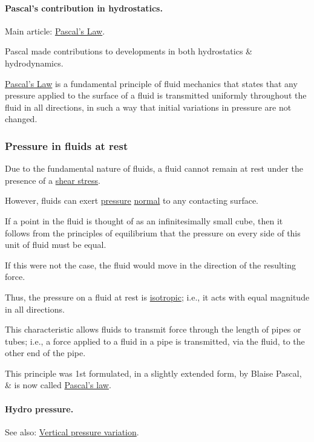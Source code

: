 \documentclass{article}
\begin{document}
\paragraph{Pascal's contribution in hydrostatics.} Main article: \href{https://en.wikipedia.org/wiki/Pascal's_Law}{Pascal's Law}.

%
Pascal made contributions to developments in both hydrostatics \& hydrodynamics.

\href{https://en.wikipedia.org/wiki/Pascal's_Law}{Pascal's Law} is a fundamental principle of fluid mechanics that states that any pressure applied to the surface of a fluid is transmitted uniformly throughout the fluid in all directions, in such a way that initial variations in pressure are not changed.

\subsubsection{Pressure in fluids at rest}
Due to the fundamental nature of fluids, a fluid cannot remain at rest under the presence of a \href{https://en.wikipedia.org/wiki/Shear_stress}{shear stress}.

However, fluids can exert \href{https://en.wikipedia.org/wiki/Pressure}{pressure} \href{https://en.wikipedia.org/wiki/Surface_normal}{normal} to any contacting surface.

If a point in the fluid is thought of as an infinitesimally small cube, then it follows from the principles of equilibrium that the pressure on every side of this unit of fluid must be equal.

If this were not the case, the fluid would move in the direction of the resulting force.

Thus, the pressure on a fluid at rest is \href{https://en.wikipedia.org/wiki/Isotropic}{isotropic}; i.e., it acts with equal magnitude in all directions.

This characteristic allows fluids to transmit force through the length of pipes or tubes; i.e., a force applied to a fluid in a pipe is transmitted, via the fluid, to the other end of the pipe.

This principle was 1st formulated, in a slightly extended form, by Blaise Pascal, \& is now called \href{https://en.wikipedia.org/wiki/Pascal's_law}{Pascal's law}.

\paragraph{Hydro pressure.} See also: \href{https://en.wikipedia.org/wiki/Vertical_pressure_variation}{Vertical pressure variation}.
\end{document}
